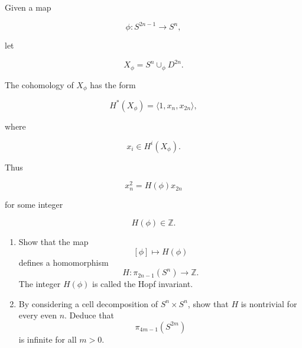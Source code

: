 \begin{problem}
Given a map

\[
\phi:S^{2n-1}\longrightarrow S^n,
\]

let

\[
X_\phi=S^n\cup_\phi D^{2n}.
\]

The cohomology of \(X_\phi\) has the form

\[
H^*(X_\phi)=\langle 1,x_n,x_{2n}\rangle,
\]

where

\[
x_i\in H^i(X_\phi).
\]

Thus

\[
x_n^2=H(\phi)x_{2n}
\]

for some integer

\[
H(\phi)\in \mathbb Z.
\]

\begin{enumerate}
	\item[(a)] Show that the map
	\[
	[\phi]\longmapsto H(\phi)
	\]
	defines a homomorphism
	\[
	H:\pi_{2n-1}(S^n)\longrightarrow \mathbb Z.
	\]
	The integer \(H(\phi)\) is called the Hopf invariant.

	\item[(b)] By considering a cell decomposition of \(S^n\times S^n\), show that \(H\) is nontrivial for every even \(n\). Deduce that
	\[
	\pi_{4m-1}(S^{2m})
	\]
	is infinite for all \(m>0\).
\end{enumerate}
\end{problem}

